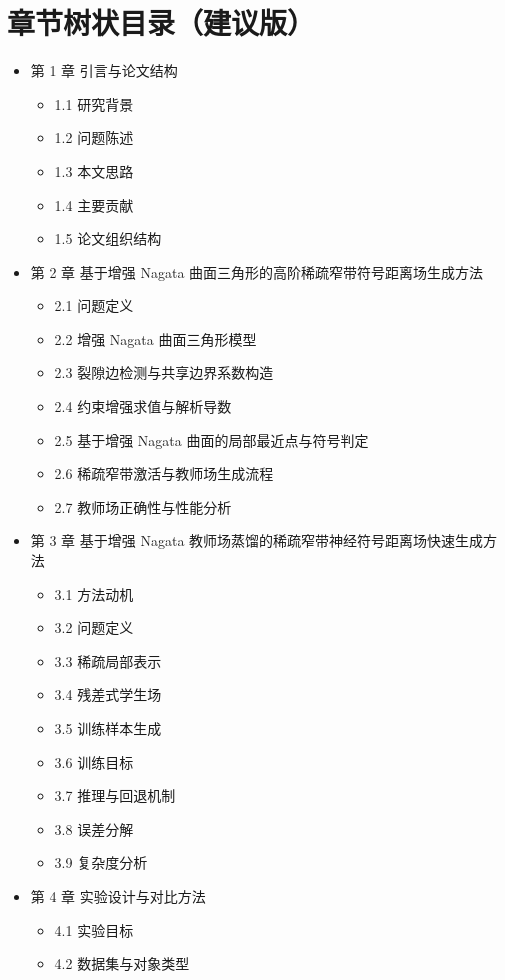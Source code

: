 \documentclass[12pt,oneside]{ctexbook}
\begin{document}
\chapter*{章节树状目录（建议版）}
\begin{itemize}
  \item 第 1 章 引言与论文结构
  \begin{itemize}
    \item 1.1 研究背景
    \item 1.2 问题陈述
    \item 1.3 本文思路
    \item 1.4 主要贡献
    \item 1.5 论文组织结构
  \end{itemize}
  \item 第 2 章 基于增强 Nagata 曲面三角形的高阶稀疏窄带符号距离场生成方法
  \begin{itemize}
    \item 2.1 问题定义
    \item 2.2 增强 Nagata 曲面三角形模型
    \item 2.3 裂隙边检测与共享边界系数构造
    \item 2.4 约束增强求值与解析导数
    \item 2.5 基于增强 Nagata 曲面的局部最近点与符号判定
    \item 2.6 稀疏窄带激活与教师场生成流程
    \item 2.7 教师场正确性与性能分析
  \end{itemize}
  \item 第 3 章 基于增强 Nagata 教师场蒸馏的稀疏窄带神经符号距离场快速生成方法
  \begin{itemize}
    \item 3.1 方法动机
    \item 3.2 问题定义
    \item 3.3 稀疏局部表示
    \item 3.4 残差式学生场
    \item 3.5 训练样本生成
    \item 3.6 训练目标
    \item 3.7 推理与回退机制
    \item 3.8 误差分解
    \item 3.9 复杂度分析
  \end{itemize}
  \item 第 4 章 实验设计与对比方法
  \begin{itemize}
    \item 4.1 实验目标
    \item 4.2 数据集与对象类型

\end{itemize}
\end{itemize}
\end{document}
